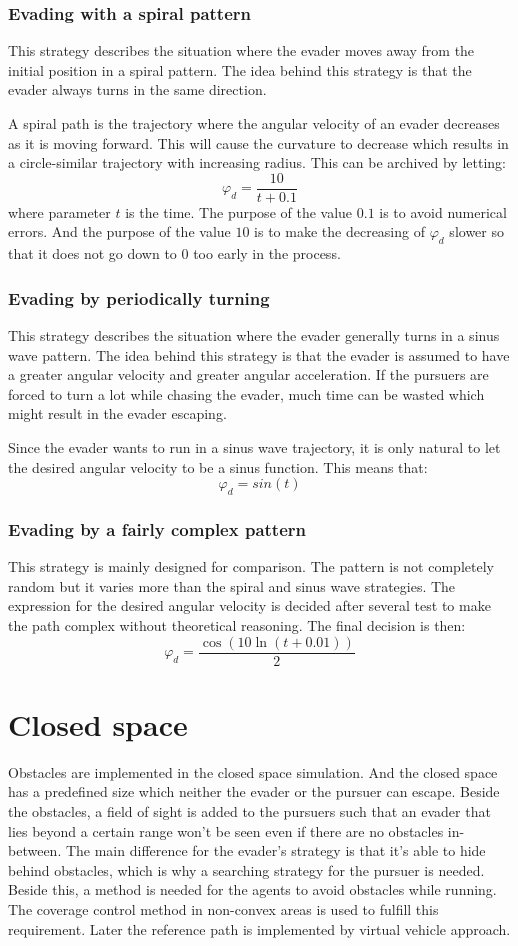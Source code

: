 \documentclass[ebook,11pt] {kth-mag}
\begin{document}
\subsubsection{Evading with a spiral pattern}
This strategy describes the situation where the evader moves away from the initial position in a spiral pattern. The idea behind this strategy is that the evader always turns in the same direction. 

A spiral path is the trajectory where the angular velocity of an evader decreases as it is moving forward. This will cause the curvature to decrease which results in a circle-similar trajectory with increasing radius. This can be archived by letting:
$$
\varphi_d = \frac{10}{t+0.1}
$$
where parameter $t$ is the time. The purpose of the value $0.1$ is to avoid numerical errors. And the purpose of the value $10$ is to make the decreasing of $\varphi_d$ slower so that it does not go down to $0$ too early in the process. 

\subsubsection{Evading by periodically turning}
This strategy describes the situation where the evader generally turns in a sinus wave pattern. The idea behind this strategy is that the evader is assumed to have a greater angular velocity and greater angular acceleration. If the pursuers are forced to turn a lot while chasing the evader, much time can be wasted which might result in the evader escaping. 

Since the evader wants to run in a sinus wave trajectory, it is only natural to let the desired angular velocity to be a sinus function. This means that: 
$$
\varphi_d = sin(t)
$$

\subsubsection{Evading by a fairly complex pattern}
This strategy is mainly designed for comparison. The pattern is not completely random but it varies more than the spiral and sinus wave strategies. The expression for the desired angular velocity is decided after several test to make the path complex without theoretical reasoning. The final decision is then: 
$$
\varphi_d = \frac{\cos(10\ln(t+0.01))}{2}
$$

\section{Closed space}
Obstacles are implemented in the closed space simulation. And the closed space has a predefined size which neither the evader or the pursuer can escape. Beside the obstacles, a field of sight is added to the pursuers such that an evader that lies beyond a certain range won't be seen even if there are no obstacles in-between. The main difference for the evader's strategy is that it's able to hide behind obstacles, which is why a searching strategy for the pursuer is needed. Beside this, a method is needed for the agents to avoid obstacles while running. The coverage control method in non-convex areas is used to fulfill this requirement. Later the reference path is implemented by virtual vehicle approach. 
\end{document}
